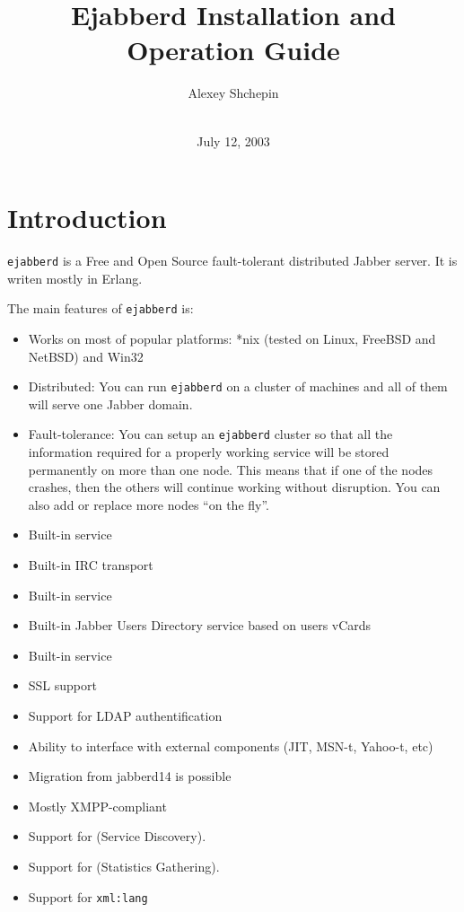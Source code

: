 \documentclass[10pt]{article}
\title{Ejabberd Installation and Operation Guide}
\author{Alexey Shchepin \\
  \ahrefurl{mailto:alexey@sevcom.net} \\
  \ahrefurl{xmpp:aleksey@jabber.ru}}
\date{July 12, 2003}
\newcommand{\logoscale}{0.7}
\newcommand{\insscaleimg}[2]{
  \imgsrc{#2}{}
  \begin{latexonly}
    \scalebox{#1}{\texttt{[image: \#2]}}
  \end{latexonly}
}
\newcommand{\ns}[1]{\texttt{#1}}
\newcommand{\ejabberd}{\texttt{ejabberd}}
\newcommand{\Jabber}{Jabber}
\begin{document}
\begin{titlepage}
  \maketitle{}
  
  {\centering
    \insscaleimg{\logoscale}{logo.png}
    \par
  }
\end{titlepage}
\tableofcontents{}

\newpage
\section{Introduction}
\label{sec:intro}

\ejabberd{} is a Free and Open Source fault-tolerant distributed \Jabber{}
server.  It is writen mostly in Erlang.

The main features of \ejabberd{} is:
\begin{itemize}
\item Works on most of popular platforms: *nix (tested on Linux, FreeBSD and
  NetBSD) and Win32
\item Distributed: You can run \ejabberd{} on a cluster of machines and all of
  them will serve one Jabber domain.
\item Fault-tolerance: You can setup an \ejabberd{} cluster so that all the
  information required for a properly working service will be stored
  permanently on more than one node.  This means that if one of the nodes
  crashes, then the others will continue working without disruption.
  You can also add or replace more nodes ``on the fly''.
\item Built-in  service
\item Built-in IRC transport
\item Built-in
  service
\item Built-in Jabber Users Directory service based on users vCards
\item Built-in
  service
\item SSL support
\item Support for LDAP authentification
\item Ability to interface with external components (JIT, MSN-t, Yahoo-t, etc)
\item Migration from jabberd14 is possible
\item Mostly XMPP-compliant
\item Support for
  (Service Discovery).
\item Support for
  (Statistics Gathering).
\item Support for \ns{xml:lang}
\end{itemize}
\end{document}
